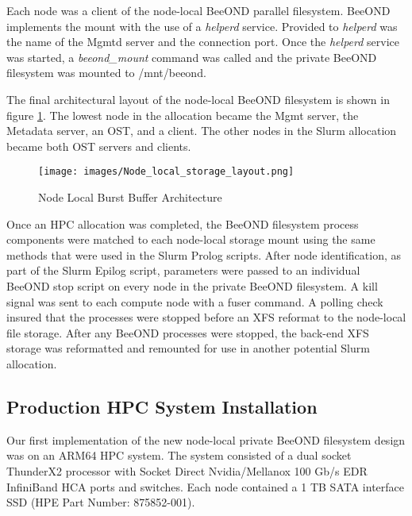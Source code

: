 Each node was a client of the node-local BeeOND parallel filesystem.  BeeOND implements the mount with the use of a \textit{helperd} service.  Provided to \textit{helperd} was the name of the Mgmtd server and the connection port.  Once the \textit {helperd} service was started, a \textit{beeond\_mount} command was called and the private BeeOND filesystem was mounted to /mnt/beeond.  
 
The final architectural layout of the node-local BeeOND filesystem is shown in figure \ref{fig:Node_local_storage_layout}.  The lowest node in the allocation became the Mgmt server, the Metadata server, an OST, and a client.  The other nodes in the Slurm allocation became both OST servers and clients.

\begin{figure}[!htb]
  \centerline{\texttt{[image: images/Node\_local\_storage\_layout.png]}}
  \caption{Node Local Burst Buffer Architecture}
  \label{fig:Node_local_storage_layout}
\end{figure}


Once an HPC allocation was completed, the BeeOND filesystem process components were matched to each node-local storage mount using the same methods that were used in the Slurm Prolog scripts. After node identification, as part of the Slurm Epilog script, parameters were passed to an individual BeeOND stop script on every node in the private BeeOND filesystem.  A kill signal was sent to each compute node with a fuser command.  A polling check insured that the processes were stopped before an XFS reformat to the node-local file storage. After any BeeOND processes were stopped, the back-end XFS storage was reformatted and remounted for use in another potential Slurm allocation.

\subsection{Production HPC System Installation}


Our first implementation of the new node-local private BeeOND filesystem design was on an ARM64 HPC system.  The system consisted of a dual socket ThunderX2 processor with Socket Direct Nvidia/Mellanox 100 Gb/s EDR InfiniBand HCA ports and switches.  Each node contained a 1 TB SATA interface SSD (HPE Part Number: 875852-001).  

